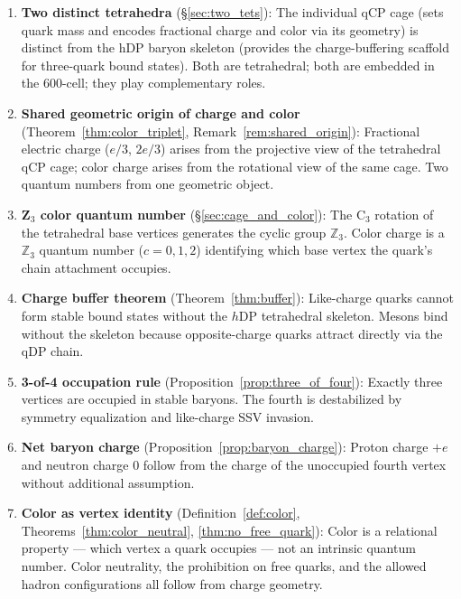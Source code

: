 \documentclass[12pt]{article}
\newcommand{\hDP}{h\mathrm{DP}}
\begin{document}
\begin{enumerate}
\item \textbf{Two distinct tetrahedra} (§\ref{sec:two_tets}): The
  individual qCP cage (sets quark mass and encodes fractional charge
  and color via its geometry) is distinct from the hDP baryon
  skeleton (provides the charge-buffering scaffold for three-quark
  bound states).  Both are tetrahedral; both are embedded in the
  600-cell; they play complementary roles.

\item \textbf{Shared geometric origin of charge and color}
  (Theorem~\ref{thm:color_triplet}, Remark~\ref{rem:shared_origin}):
  Fractional electric charge ($e/3$, $2e/3$) arises from the
  projective view of the tetrahedral qCP cage; color charge arises
  from the rotational view of the same cage.  Two quantum numbers
  from one geometric object.

\item \textbf{Z$_3$ color quantum number} (§\ref{sec:cage_and_color}):
  The C$_3$ rotation of the tetrahedral base vertices generates the
  cyclic group $\mathbb{Z}_3$.  Color charge is a $\mathbb{Z}_3$
  quantum number ($c = 0, 1, 2$) identifying which base vertex the
  quark's chain attachment occupies.

\item \textbf{Charge buffer theorem} (Theorem~\ref{thm:buffer}):
  Like-charge quarks cannot form stable bound states without the
  $\hDP$ tetrahedral skeleton.  Mesons bind without the skeleton
  because opposite-charge quarks attract directly via the qDP chain.

\item \textbf{3-of-4 occupation rule} (Proposition~\ref{prop:three_of_four}):
  Exactly three vertices are occupied in stable baryons.  The fourth
  is destabilized by symmetry equalization and like-charge SSV
  invasion.

\item \textbf{Net baryon charge} (Proposition~\ref{prop:baryon_charge}):
  Proton charge $+e$ and neutron charge $0$ follow from the charge
  of the unoccupied fourth vertex without additional assumption.

\item \textbf{Color as vertex identity} (Definition~\ref{def:color},
  Theorems~\ref{thm:color_neutral}, \ref{thm:no_free_quark}):
  Color is a relational property --- which vertex a quark occupies
  --- not an intrinsic quantum number.  Color neutrality, the
  prohibition on free quarks, and the allowed hadron configurations
  all follow from charge geometry.


\end{enumerate}
\end{document}
